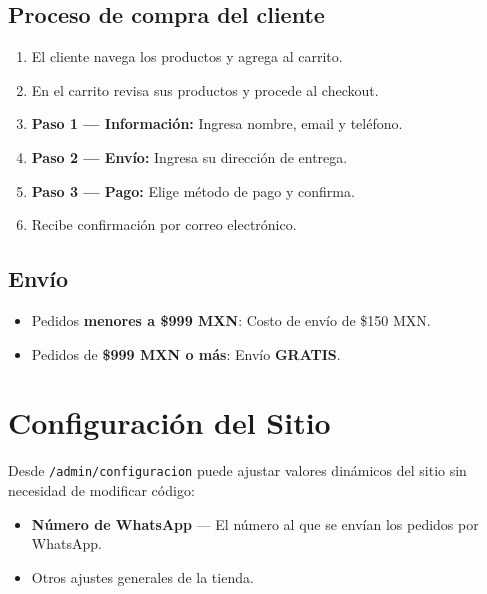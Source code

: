 \documentclass[12pt,a4paper]{article}
\begin{document}
\subsection{Proceso de compra del cliente}

\begin{enumerate}[leftmargin=2cm]
    \item El cliente navega los productos y agrega al carrito.
    \item En el carrito revisa sus productos y procede al checkout.
    \item \textbf{Paso 1 --- Información:} Ingresa nombre, email y teléfono.
    \item \textbf{Paso 2 --- Envío:} Ingresa su dirección de entrega.
    \item \textbf{Paso 3 --- Pago:} Elige método de pago y confirma.
    \item Recibe confirmación por correo electrónico.
\end{enumerate}

\subsection{Envío}

\begin{infobox}
\begin{itemize}
    \item Pedidos \textbf{menores a \$999 MXN}: Costo de envío de \$150 MXN.
    \item Pedidos de \textbf{\$999 MXN o más}: Envío \textbf{GRATIS}.
\end{itemize}
\end{infobox}

\section{Configuración del Sitio}

Desde \texttt{/admin/configuracion} puede ajustar valores dinámicos del sitio sin necesidad de modificar código:

\begin{itemize}[leftmargin=2cm]
    \item \textbf{Número de WhatsApp} --- El número al que se envían los pedidos por WhatsApp.
    \item Otros ajustes generales de la tienda.
\end{itemize}
\end{document}
